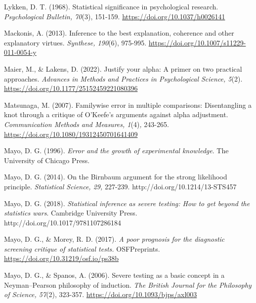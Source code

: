 \documentclass[authordate, empirical]{jote-new-article}
\begin{document}
	Lykken, D. T. (1968). Statistical significance in psychological research. \emph{Psychological Bulletin, 70}(3), 151-159. \href{https://doi.org/10.1037/h0026141}{https://doi.org/10.1037/h0026141}



	Mackonis, A. (2013). Inference to the best explanation, coherence and other explanatory virtues. \emph{Synthese, 190}(6), 975-995. \href{https://doi.org/10.1007/s11229-011-0054-y}{https://doi.org/10.1007/s11229-011-0054-y}



	Maier, M., \& Lakens, D. (2022). Justify your alpha: A primer on two practical approaches. \emph{Advances in Methods and Practices in Psychological Science, 5}(2). \href{https://doi.org/10.1177/25152459221080396}{https://doi.org/10.1177/25152459221080396}



	Matsunaga, M. (2007). Familywise error in multiple comparisons: Disentangling a knot through a critique of O'Keefe's arguments against alpha adjustment. \emph{Communication Methods and Measures, 1}(4)\emph{, }243-265. \href{https://doi.org/10.1080/19312450701641409}{https://doi.org/10.1080/19312450701641409}



	Mayo, D. G. (1996). \emph{Error and the growth of experimental knowledge}. The University of Chicago Press.



	Mayo, D. G. (2014). On the Birnbaum argument for the strong likelihood principle. \emph{Statistical Science, 29,} 227-239. http://doi.org/10.1214/13-STS457



	Mayo, D. G. (2018). \emph{Statistical inference as severe testing: How to get beyond the statistics wars}. Cambridge University Press. http://doi.org/10.1017/9781107286184



	Mayo, D. G., \& Morey, R. D. (2017). \emph{A poor prognosis for the diagnostic screening critique of statistical tests.} OSFPreprints. \href{https://doi.org/10.31219/osf.io/ps38b}{https://doi.org/10.31219/osf.io/ps38b}



	Mayo, D. G., \& Spanos, A. (2006). Severe testing as a basic concept in a Neyman--Pearson philosophy of induction. \emph{The British Journal for the Philosophy of Science, 57}(2), 323-357. \href{https://doi.org/10.1093/bjps/axl003}{https://doi.org/10.1093/bjps/axl003}
\end{document}
